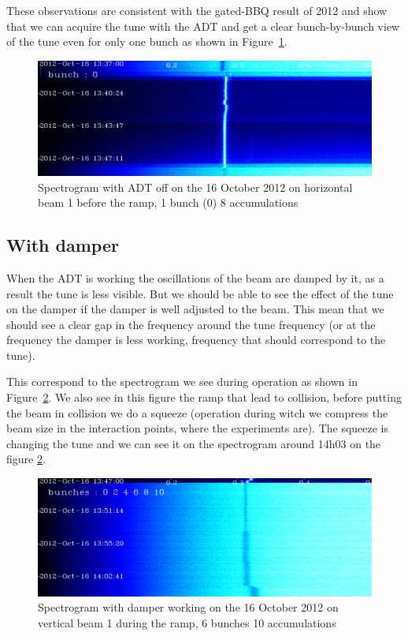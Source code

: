 	These observations are consistent with the gated-\gls{BBQ} result of 2012 \cite{Valuch12} and show that we can acquire the tune with the \gls{ADT} and get a clear bunch-by-bunch view of the tune even for only one bunch as shown in Figure~\ref{fig:bunch_0_adt_off}.

	\begin{figure}[H]
	\caption{Spectrogram with ADT off on the 16 October 2012 on horizontal beam 1 before the ramp, 1 bunch (0) 8 accumulations}
	\label{fig:bunch_0_adt_off}
	\centering
	\includegraphics[scale=0.3]{md-121016-hb1-m1-bunch000001-8acc-1337-1349.pdf}
	\end{figure}

	\subsection{With damper}

	When the \gls{ADT} is working the oscillations of the beam are damped by it, as a result the tune is less visible. But we should be able to see the effect of the tune on the damper if the damper is well adjusted to the beam. This mean that we should see a clear gap in the frequency around the tune frequency (or at the frequency the damper is less working, frequency that should correspond to the tune).

	This correspond to the spectrogram we see during operation as shown in Figure~\ref{fig:ramp}. We also see in this figure the ramp that lead to collision, before putting the beam in collision we do a squeeze (operation during witch we compress the beam size in the interaction points, where the experiments are). The squeeze is changing the tune and we can see it on the spectrogram around 14h03 on the figure \ref{fig:ramp}.

	\begin{figure}[H]
	\caption{Spectrogram with damper working on the 16 October 2012 on vertical beam 1 during the ramp, 6 bunches 10 accumulations}
	\centering
	\label{fig:ramp}
	\includegraphics[scale=0.3]{md-121016-vb1-m1-6bunches-10acc-1347-1405-ramp.pdf}
	\end{figure}


